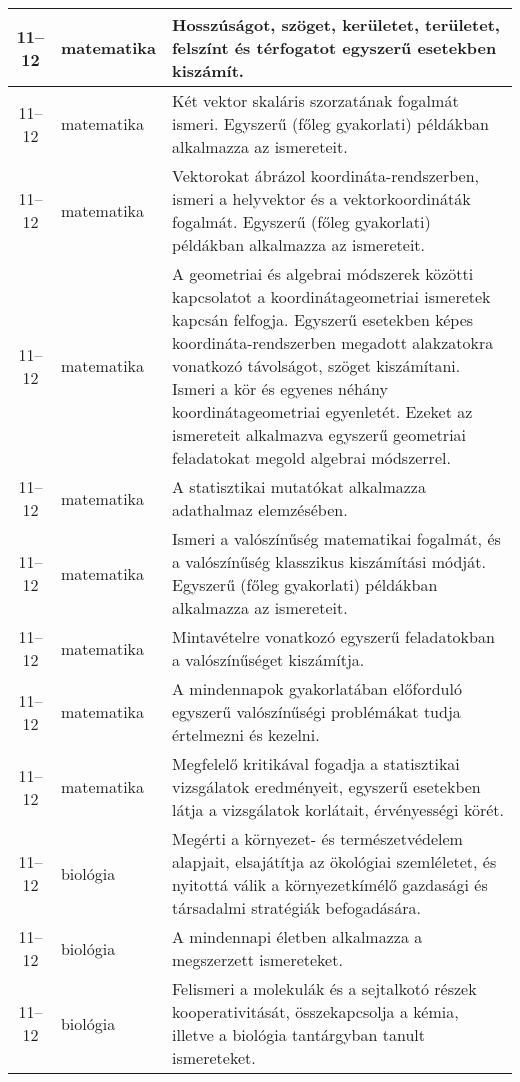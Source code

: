 \begin{small}
\begin{longtable}{c | p{2cm} |  p{11cm} }
              11--12 & matematika & Hosszúságot, szöget, kerületet, területet, felszínt és térfogatot egyszerű esetekben kiszámít. \\ \hline
              11--12 & matematika & Két vektor skaláris szorzatának fogalmát ismeri.  Egyszerű (főleg gyakorlati) példákban alkalmazza az ismereteit. \\ \hline
              11--12 & matematika & Vektorokat ábrázol koordináta-rendszerben, ismeri a helyvektor és a vektorkoordináták fogalmát. Egyszerű (főleg gyakorlati) példákban alkalmazza az ismereteit. \\ \hline
              11--12 & matematika & A geometriai és algebrai módszerek közötti kapcsolatot a koordinátageometriai ismeretek kapcsán felfogja. Egyszerű esetekben képes koordináta-rendszerben megadott alakzatokra vonatkozó távolságot, szöget kiszámítani. Ismeri a kör és egyenes néhány koordinátageometriai egyenletét. Ezeket az ismereteit alkalmazva egyszerű geometriai feladatokat megold algebrai módszerrel. \\ \hline
              11--12 & matematika & A statisztikai mutatókat alkalmazza adathalmaz elemzésében. \\ \hline
              11--12 & matematika & Ismeri a valószínűség matematikai fogalmát, és a valószínűség klasszikus kiszámítási módját. Egyszerű (főleg gyakorlati) példákban alkalmazza az ismereteit. \\ \hline
              11--12 & matematika & Mintavételre vonatkozó egyszerű feladatokban a valószínűséget kiszámítja. \\ \hline
              11--12 & matematika & A mindennapok gyakorlatában előforduló egyszerű valószínűségi problémákat tudja értelmezni és kezelni. \\ \hline
              11--12 & matematika & Megfelelő kritikával fogadja a statisztikai vizsgálatok eredményeit, egyszerű esetekben látja a vizsgálatok korlátait, érvényességi körét. \\ \hline
              11--12 & biológia & Megérti a környezet- és természetvédelem alapjait, elsajátítja az ökológiai szemléletet, és nyitottá válik a környezetkímélő gazdasági és társadalmi stratégiák befogadására. \\ \hline
              11--12 & biológia & A mindennapi életben alkalmazza a megszerzett ismereteket. \\ \hline
              11--12 & biológia & Felismeri a molekulák és a sejtalkotó részek kooperativitását, összekapcsolja  a kémia, illetve a biológia tantárgyban tanult ismereteket. \\ \hline

\end{longtable}
\end{small}
